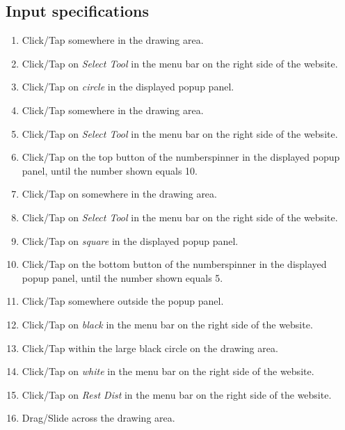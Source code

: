 \subsection*{Input specifications}
\begin{enumerate}
\item Click/Tap somewhere in the drawing area.
\item Click/Tap on \emph{Select Tool} in the menu bar on the right side of the website.
\item Click/Tap on \emph{circle} in the displayed popup panel.
\item Click/Tap somewhere in the drawing area.
\item Click/Tap on \emph{Select Tool} in the menu bar on the right side of the website.
\item Click/Tap on the top button of the numberspinner in the displayed popup panel, until the number shown equals 10.
\item Click/Tap on somewhere in the drawing area.
\item Click/Tap on \emph{Select Tool} in the menu bar on the right side of the website. 
\item Click/Tap on \emph{square} in the displayed popup panel.
\item Click/Tap on the bottom button of the numberspinner in the displayed popup panel, until the number shown equals 5.
\item Click/Tap somewhere outside the popup panel.
\item Click/Tap on \emph{black} in the menu bar on the right side of the website. 
\item Click/Tap within the large black circle on the drawing area.
\item Click/Tap on \emph{white} in the menu bar on the right side of the website. 
\item Click/Tap on \emph{Rest Dist} in the menu bar on the right side of the website. 
\item Drag/Slide across the drawing area.
\end{enumerate}

